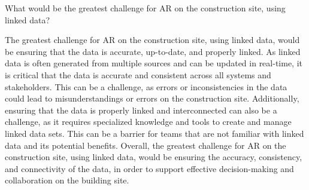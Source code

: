 \begin{description}
	\me What would be the greatest challenge for AR on the construction site, using linked data?

	\gpt The greatest challenge for AR on the construction site, using linked data, would be ensuring that the data is accurate, up-to-date, and properly linked.
	As linked data is often generated from multiple sources and can be updated in real-time, it is critical that the data is accurate and consistent across all systems and stakeholders. This can be a challenge, as errors or inconsistencies in the data could lead to misunderstandings or errors on the construction site.
	Additionally, ensuring that the data is properly linked and interconnected can also be a challenge, as it requires specialized knowledge and tools to create and manage linked data sets. This can be a barrier for teams that are not familiar with linked data and its potential benefits.
	Overall, the greatest challenge for AR on the construction site, using linked data, would be ensuring the accuracy, consistency, and connectivity of the data, in order to support effective decision-making and collaboration on the building site.

\end{description}